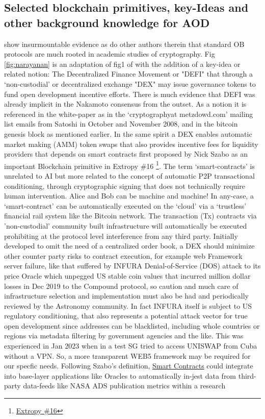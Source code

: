 \documentclass[final,5p,times,twocolumn,authoryear]{elsarticle}
\begin{document}
\subsection{Selected blockchain primitives, key-Ideas and other background knowledge for AOD}
\label{subsec: review}

\cite{arvindandclark2017} show insurmountable evidence as do other authors therein that standard OB protocols are much rooted in academic studies of cryptography. Fig \ref{fig:narayanan} is an adaptation of fig1 of \citet{arvindandclark2017} with the addition of a key-idea or related notion: The Decentralized Finance Movement or "DEFI" that through a `non-custodial' or decentralized exchange "DEX" may issue governance tokens to fund open development incentive efforts. There is much evidence that DEFI was already implicit in the Nakamoto consensus from the outset. As a notion it is referenced in the white-paper as in the `cryptographyat metzdowd.com' mailing list emails from Satoshi in October and November 2008, and in the bitcoin genesis block as mentioned earlier. In the same spirit a DEX enables automatic market making (AMM) token swaps that also provides incentive fees for liquidity providers that depends on smart contracts first proposed by Nick Szabo as an important Blockchain primitive in Extropy \#16 \footnote{\href{ https://archive.org/details/extropy-16}{Extropy \#16}}. The term `smart-contracts' is unrelated to AI but more related to the concept of automatic P2P transactional conditioning, through cryptographic signing that does not technically require human intervention. Alice and Bob can be machine and machine!  In any-case, a `smart-contract' can be automatically executed on the `cloud' via a `trustless' financial rail system like the Bitcoin network. The transaction (Tx) contracts via 'non-custodial' community built infrastructure will automatically be executed prohibiting at the protocol level interference from any third party. Initially developed to omit the need of a centralized order book, a DEX should minimize other counter party risks to contract execution, for example web Framework server failure, like that suffered by INFURA Denial-of-Service (DOS) attack to its price Oracle which unpegged US stable coin values that incurred million dollar losses in Dec 2019 to the Compound protocol, so caution and much care of infrastructure selection and implementation must also be had and periodically reviewed by the Astronomy community. In fact INFURA itself is subject to US regulatory conditioning, that also represents a potential attack vector for true open development since addresses can be blacklisted, including whole countries or regions via metadata filtering by government agencies and the like. This was experienced in Jan 2023 when in a test SG tried to access UNISWAP from Cuba without a VPN. So, a more transparent WEB5 framework may be required for our specfic needs. Following Szabo's definition, \href{https://www.fon.hum.uva.nl/rob/Courses/InformationInSpeech/CDROM/Literature/LOTwinterschool2006/szabo.best.vwh.net/smart.contracts.html}{Smart Contracts} could integrate into base-layer applications like Oracles to automatically in-jest data from third-party data-feeds like NASA ADS publication metrics within a research 
\end{document}
